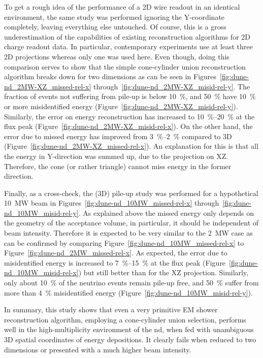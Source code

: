 To get a rough idea of the performance of a 2D wire readout in an identical environment, the same study was performed ignoring the Y-coordinate completely, leaving everything else untouched.
Of course, this is a gross underestimation of the capabilities of existing reconstruction algorithms for 2D charge readout data.
In particular, contemporary experiments use at least three 2D projections whereas only one was used here.
Even though, doing this comparison serves to show that the simple cone-cylinder union reconstruction algorithm breaks down for two dimensions as can be seen in Figures~\ref{fig:dune-nd_2MW-XZ_missed-rel-x} through~\ref{fig:dune-nd_2MW-XZ_misid-rel-y}.
The fraction of events not suffering from pile-up is below \SI{10}{\percent}, and \SI{50}{\percent} have \SI{10}{\percent} or more misidentified energy (Figure~\ref{fig:dune-nd_2MW-XZ_misid-rel-y}).
Similarly, the error on energy reconstruction has increased to \SIrange{10}{20}{\percent} at the flux peak (Figure~\ref{fig:dune-nd_2MW-XZ_misid-rel-x}).
On the other hand, the error due to missed energy has improved from \SIrange{3}{2}{\percent} compared to 3D (Figure~\ref{fig:dune-nd_2MW-XZ_missed-rel-x}).
An explanation for this is that all the energy in Y-direction was summed up, due to the projection on XZ.
Therefore, the cone (or rather triangle) cannot miss energy in the former direction.

Finally, as a cross-check, the (3D) pile-up study was performed for a hypothetical \SI{10}{\mega\watt} beam in Figures~\ref{fig:dune-nd_10MW_missed-rel-x} through~\ref{fig:dune-nd_10MW_misid-rel-y}.
As explained above the missed energy only depends on the geometry of the acceptance volume, in particular, it should be independent of beam intensity.
Therefore it is expected to be very similar to the \SI{2}{\mega\watt} case as can be confirmed by comparing Figure~\ref{fig:dune-nd_10MW_missed-rel-x} to Figure~\ref{fig:dune-nd_2MW_missed-rel-x}.
As expected, the error due to misidentified energy is increased to \SIrange{7}{15}{\percent} at the flux peak (Figure~\ref{fig:dune-nd_10MW_misid-rel-x}) but still better than for the XZ projection.
Similarly, only about \SI{10}{\percent} of the neutrino events remain pile-up free, and \SI{50}{\percent} suffer from more than \SI{4}{\percent} misidentified energy (Figure~\ref{fig:dune-nd_10MW_misid-rel-y}).

In summary, this study shows that even a very primitive EM shower reconstruction algorithm, employing a cone-cylinder union selection, performs well in the high-multiplicity environment of the \dune{} \gls{nd}, when fed with unambiguous 3D spatial coordinates of energy depositions.
It clearly fails when reduced to two dimensions or presented with a much higher beam intensity.